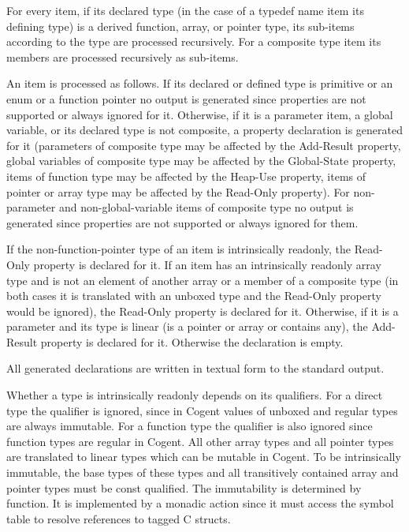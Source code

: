 For every item, if its declared type (in the case of a typedef name item its defining type) is
a derived function, array, or pointer type, its sub-items according to the 
type are processed recursively. For a composite type item its members are processed recursively as sub-items.

An item is processed as follows. If its declared or defined type is primitive or an enum or a function pointer no output 
is generated since properties are not 
supported or always ignored for it. Otherwise, if it is a parameter item, a global variable, or its declared type is 
not composite, a property
declaration is generated for it (parameters of composite type may be affected by the Add-Result property, global variables 
of composite type may be affected by the Global-State property, items of function
type may be affected by the Heap-Use property, items of pointer or array type may be affected by the Read-Only property).
For non-parameter and non-global-variable items of composite type no output is generated since properties are not 
supported or always ignored for them.

If the non-function-pointer type of an item is intrinsically readonly, the Read-Only property is declared for it. If an 
item has an intrinsically readonly array type and is not an element of another array or a member of a composite type (in both
cases it is translated with an unboxed type and the Read-Only property would be ignored), the Read-Only property
is declared for it. Otherwise, if it is a parameter and its type is linear (is a pointer or array or contains any),
the Add-Result property is declared for it. Otherwise the declaration is empty.

All generated declarations are written in textual form to the standard output.

Whether a type is intrinsically readonly depends on its  qualifiers. For a direct type the 
qualifier is ignored, since in Cogent values of unboxed and regular types are always immutable. For
a function type the qualifier is also ignored since function types are regular in Cogent. All other array types 
and all pointer types are translated to linear types which can be mutable in
Cogent. To be intrinsically immutable, the base types of these types and all transitively contained array and pointer 
types must be const qualified. The immutability is determined by function. It is implemented
by a monadic action since it must access the symbol table to resolve references to tagged C structs.

